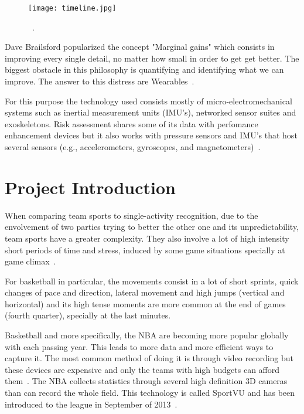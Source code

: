 \begin{figure}[htbp]
    \centering
    \texttt{[image: timeline.jpg]}
    \caption{~\cite[Timeline of sensing technology intertwined with basketball sport]{perspective}.}
    \label{fig:sensorTimeline}
\end{figure}

Dave Brailsford popularized the concept "Marginal gains" which consists in improving every single detail, no matter how small in order to get get better. The biggest obstacle in 
this philosophy is quantifying and identifying what we can improve. The answer to this distress are Wearables~\cite{impactWearable}.

For this purpose the technology used consists mostly of micro-electromechanical systems such as inertial measurement units (IMU's), networked sensor suites and exoskeletons. 
Risk assessment shares some of its data with perfomance enhancement devices but it also works with 
pressure sensors and IMU's that host several sensors (e.g., accelerometers, gyroscopes, and magnetometers)~\cite{biomechanicalPerfomance}. 

\section{Project Introduction}
\label{sec:introduction}

When comparing team sports to single-activity recognition, due to the envolvement of two parties trying to better the other one and its unpredictability, team sports have a greater complexity. 
They also involve a lot of high intensity short periods of time and stress, induced by some game situations specially at game climax~\cite{performanceAndTactics}. 

For basketball in particular, the movements consist in a lot of short sprints, quick changes of pace and direction, lateral movement and high jumps (vertical and horizontal) and its high tense moments are more common 
at the end of games (fourth quarter), specially at the last minutes.

Basketball and more specifically, the NBA are becoming more popular globally with each passing year. This leads to more data and more efficient ways to capture it. The most common method 
of doing it is through video recording but these devices are expensive and only the teams with high budgets can afford them~\cite{basketballMotions}. 
The NBA collects statistics through several high definition 3D cameras than can record the whole field. This technology is called SportVU and has been introduced to the league in September of 2013~\cite{basketballFootwork}.

